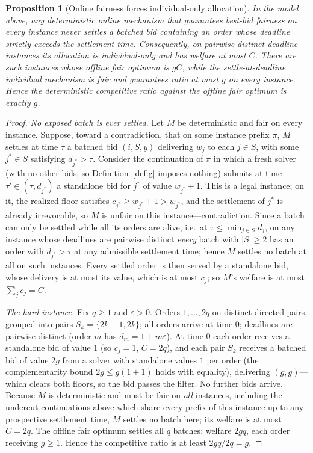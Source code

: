 \documentclass[11pt]{article}
\newtheorem{proposition}{Proposition}
\theoremstyle{remark}
\begin{document}
\begin{proposition}[Online fairness forces individual-only allocation]
\label{prop:online}
In the model above, any deterministic online mechanism that guarantees
best-bid fairness on every instance never settles a batched bid containing
an order whose deadline strictly exceeds the settlement time. Consequently,
on pairwise-distinct-deadline instances its allocation is individual-only
and has welfare at most $C$. There are such instances whose offline fair
optimum is $gC$, while the settle-at-deadline individual mechanism is fair
and guarantees ratio at most $g$ on every instance. Hence the deterministic
competitive ratio against the offline fair optimum is exactly $g$.
\end{proposition}

\begin{proof}
\emph{No exposed batch is ever settled.}
Let $M$ be deterministic and fair on every instance. Suppose, toward a
contradiction, that on some instance prefix $\pi$, $M$ settles at time
$\tau$ a batched bid $(i,S,y)$ delivering $w_{j}$ to each $j\in S$, with
some $j^\ast\in S$ satisfying $d_{j^\ast}>\tau$. Consider the continuation
of $\pi$ in which a fresh solver (with no other bids, so
Definition~\ref{def:g} imposes nothing) submits at time
$\tau'\in(\tau,d_{j^\ast})$ a standalone bid for $j^\ast$ of value
$w_{j^\ast}+1$. This is a legal instance; on it, the realized floor
satisfies $c_{j^\ast}\ge w_{j^\ast}+1>w_{j^\ast}$, and the settlement of
$j^\ast$ is already irrevocable, so $M$ is unfair on this
instance---contradiction. Since a batch can only be settled while all its
orders are alive, i.e.\ at $\tau\le\min_{j\in S}d_j$, on any instance whose
deadlines are pairwise distinct \emph{every} batch with $|S|\ge2$ has an
order with $d_{j^\ast}>\tau$ at any admissible settlement time; hence $M$
settles no batch at all on such instances. Every settled order is then
served by a standalone bid, whose delivery is at most its value, which is
at most $c_j$; so $M$'s welfare is at most $\sum_j c_j=C$.

\emph{The hard instance.}
Fix $q\ge1$ and $\varepsilon>0$. Orders $1,\dots,2q$ on distinct directed
pairs, grouped into pairs $S_k=\{2k-1,2k\}$; all orders arrive at time $0$;
deadlines are pairwise distinct (order $m$ has $d_m=1+m\varepsilon$). At
time $0$ each order receives a standalone bid of value $1$ (so $c_j=1$,
$C=2q$), and each pair $S_k$ receives a batched bid of value $2g$ from a
solver with standalone values $1$ per order (the complementarity bound
$2g\le g(1+1)$ holds with equality), delivering $(g,g)$---which clears
both floors, so the bid passes the filter. No further bids arrive. Because
$M$ is deterministic and must be fair on \emph{all} instances, including
the undercut continuations above which share every prefix of this instance
up to any prospective settlement time, $M$ settles no batch here; its
welfare is at most $C=2q$. The offline fair optimum settles all $q$
batches: welfare $2gq$, each order receiving $g\ge1$. Hence the
competitive ratio is at least $2gq/2q=g$.


\end{proof}
\end{document}
